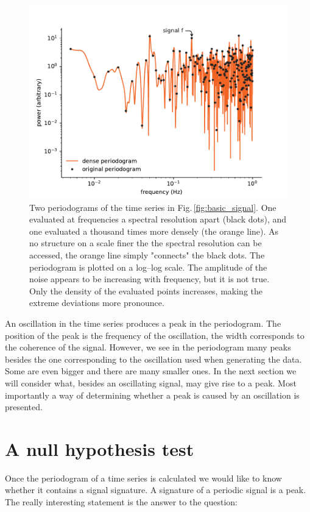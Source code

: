 \begin{figure}
  \centering \includegraphics[width=0.8\linewidth]{gfx/axions/basic_periodogram_loglog.pdf}
  \caption{Two periodograms of the time series in Fig.\,\ref{fig:basic_signal}. One evaluated at frequencies a spectral resolution apart (black dots), and one evaluated a thousand times more densely (the orange line). As no structure on a scale finer the the spectral resolution can be accessed, the orange line simply "connects" the black dots. The periodogram is plotted on a log--log scale. The amplitude of the noise appears to be increasing with frequency, but it is not true. Only the density of the evaluated points increases, making the extreme deviations more pronounce.}
  \label{fig:basic_periodogram_loglog}
\end{figure}

An oscillation in the time series produces a peak in the periodogram. The position of the peak is the frequency of the oscillation, the width corresponds to the coherence of the signal. However, we see in the periodogram many peaks besides the one corresponding to the oscillation used when generating the data. Some are even bigger and there are many smaller ones. In the next section we will consider what, besides an oscillating signal, may give rise to a peak. Most importantly a way of determining whether a peak is caused by an oscillation is presented.




\section{A null hypothesis test}
Once the periodogram of a time series is calculated we would like to know whether it contains a signal signature. A signature of a periodic signal is a peak. The really interesting statement is the answer to the question:

